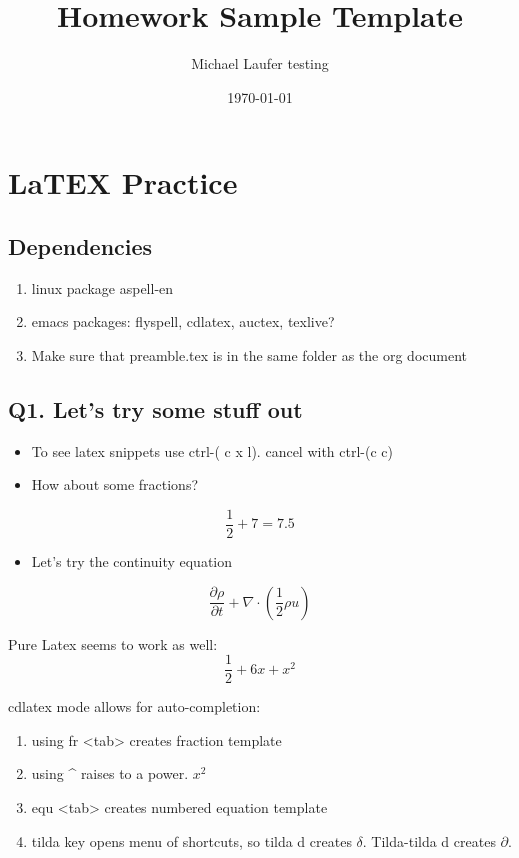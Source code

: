 \documentclass[11pt]{article}
\author{Michael Laufer testing}
\date{\today}
\title{Homework Sample Template}
\begin{document}
\maketitle
\section{LaTEX Practice}
\label{sec-1}
\subsection{Dependencies}
\label{sec-1-1}
\begin{enumerate}
\item linux package aspell-en
\item emacs packages: flyspell, cdlatex, auctex, texlive?
\item Make sure that preamble.tex is in the same folder as the org document
\end{enumerate}

\subsection{Q1. Let's try some stuff out}
\label{sec-1-2}
\begin{itemize}
\item To see latex snippets use ctrl-( c x l). cancel with ctrl-(c c)
\item How about some fractions?
\end{itemize}
\[\frac{1}{2} + 7 = 7.5\]
\begin{itemize}
\item Let's try the continuity equation
\end{itemize}
\[\frac{\partial \rho}{\partial t} + \nabla \cdot \left(\frac{1}{2}\rho u\right)\]

Pure Latex seems to work as well:
\begin{equation}
\frac{1}{2} + 6x + x^{2}
\end{equation}

cdlatex mode allows for auto-completion:
\begin{enumerate}
\item using fr <tab> creates fraction template
\item using \^{} raises to a power. $x^{2}$
\item equ <tab> creates numbered equation template
\item tilda key opens menu of shortcuts, so tilda d creates $\delta$. Tilda-tilda d creates $\partial$.
\end{enumerate}
\end{document}
